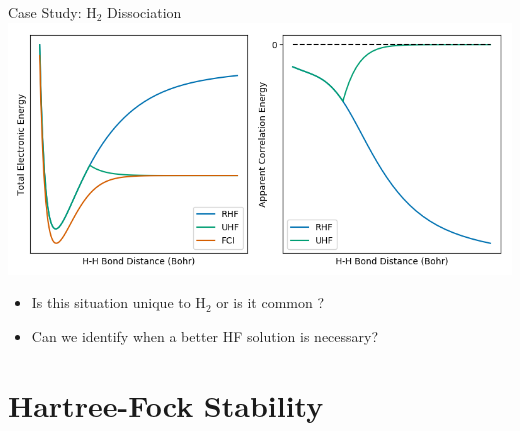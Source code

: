 \documentclass[10pt]{beamer}
\begin{document}
{{{%
\begin{frame}{Case Study: H$_2$ Dissociation}
  \centering
	\includegraphics[width=\linewidth]{../figures/H2_curves.png}
	\begin{itemize}[<+->]
    \item {Is this situation unique to H$_2$ or is it common
    ?}
		\item {Can we identify when a better HF solution is necessary?}

	\end{itemize}
\end{frame}


\section{Hartree-Fock Stability}

{%

}}}}
\end{document}

